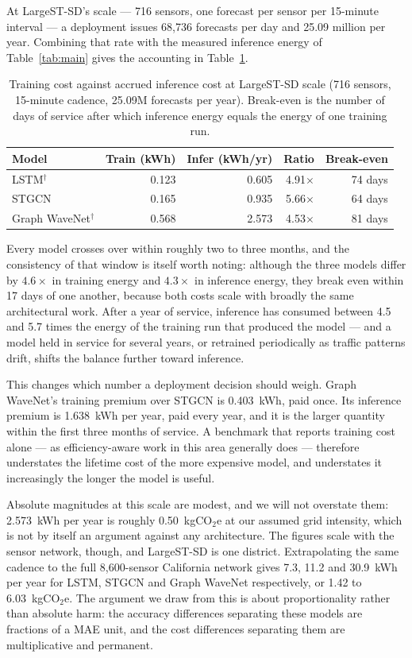\documentclass[manuscript,screen,review]{acmart}
\begin{document}
At LargeST-SD's scale --- 716 sensors, one forecast per sensor per 15-minute
interval --- a deployment issues 68{,}736 forecasts per day and 25.09 million
per year. Combining that rate with the measured inference energy of
Table~\ref{tab:main} gives the accounting in Table~\ref{tab:lifetime}.

\begin{table}[t]
\centering
\caption{Training cost against accrued inference cost at LargeST-SD scale
(716 sensors, 15-minute cadence, 25.09M forecasts per year). Break-even is
the number of days of service after which inference energy equals the energy
of one training run.}
\label{tab:lifetime}
\begin{tabular}{lrrrr}
\toprule
Model & Train (kWh) & Infer (kWh/yr) & Ratio & Break-even \\
\midrule
LSTM$^{\dag}$          & 0.123 & 0.605 & 4.91$\times$ & 74 days \\
STGCN                  & 0.165 & 0.935 & 5.66$\times$ & 64 days \\
Graph WaveNet$^{\dag}$ & 0.568 & 2.573 & 4.53$\times$ & 81 days \\
\bottomrule
\end{tabular}
\end{table}

Every model crosses over within roughly two to three months, and the
consistency of that window is itself worth noting: although the three models
differ by $4.6\times$ in training energy and $4.3\times$ in inference energy,
they break even within 17 days of one another, because both costs scale with
broadly the same architectural work. After a year of service, inference has
consumed between 4.5 and 5.7 times the energy of the training run that
produced the model --- and a model held in service for several years, or
retrained periodically as traffic patterns drift, shifts the balance further
toward inference.

This changes which number a deployment decision should weigh. Graph WaveNet's
training premium over STGCN is 0.403~kWh, paid once. Its inference premium is
1.638~kWh per year, paid every year, and it is the larger quantity within the
first three months of service. A benchmark that reports training cost alone
--- as efficiency-aware work in this area generally does --- therefore
understates the lifetime cost of the more expensive model, and understates it
increasingly the longer the model is useful.

Absolute magnitudes at this scale are modest, and we will not overstate them:
2.573~kWh per year is roughly 0.50~kgCO$_2$e at our assumed grid intensity,
which is not by itself an argument against any architecture. The figures scale
with the sensor network, though, and LargeST-SD is one district. Extrapolating
the same cadence to the full 8{,}600-sensor California network gives 7.3,
11.2 and 30.9~kWh per year for LSTM, STGCN and Graph WaveNet respectively,
or 1.42 to 6.03~kgCO$_2$e. The argument we draw from this is about
proportionality rather than absolute harm: the accuracy differences separating
these models are fractions of a MAE unit, and the cost differences separating
them are multiplicative and permanent.
\end{document}
